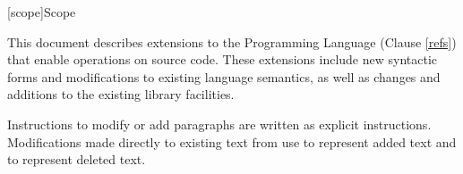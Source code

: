 
[scope]{Scope}

\pnum
This document describes extensions to the \Cpp Programming
Language (Clause \ref{refs}) that enable operations on source code. These
extensions include new syntactic forms and modifications to existing language
semantics, as well as changes and additions to the existing library facilities.

\pnum
Instructions to modify or add paragraphs are written as explicit instructions. Modifications made directly to existing text from {\cppstddocno} use  to represent added text and  to represent deleted text.
